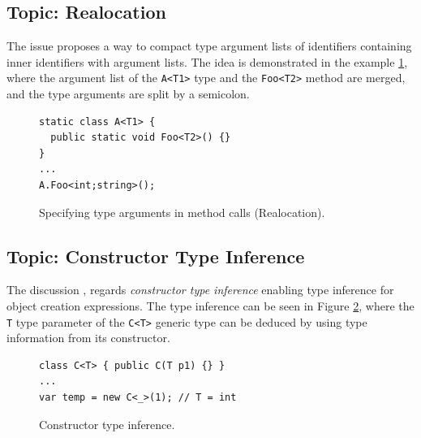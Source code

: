 \subsection{Topic: Realocation} \label{sect13:is8}

The issue \cite{online:Realloc} proposes a way to compact type argument lists of identifiers containing inner identifiers with argument lists. 
The idea is demonstrated in the example \ref{img25:Realloc}, where the argument list of the \texttt{A<T1>} type and the \texttt{Foo<T2>} method are merged, and the type arguments are split by a semicolon.
\begin{figure}[h]
\begin{lstlisting}[style=csharp]
static class A<T1> {
  public static void Foo<T2>() {}
}
...
A.Foo<int;string>();
\end{lstlisting}
\caption{Specifying type arguments in method calls (Realocation).}
\label{img25:Realloc}
\end{figure}

\subsection{Topic: Constructor Type Inference} \label{sect14:is9}

The discussion \cite{online:CtorTInf}, regards \textit{constructor type inference} enabling type inference for object creation expressions. 
The type inference can be seen in Figure \ref{img26:CtorTInf}, where the \texttt{T} type parameter of the \texttt{C<T>} generic type can be deduced by using type information from its constructor.
\begin{figure}[h!]
\begin{lstlisting}[style=csharp]
class C<T> { public C(T p1) {} }
...
var temp = new C<_>(1); // T = int
\end{lstlisting}
\caption{Constructor type inference.}
\label{img26:CtorTInf}
\end{figure}
